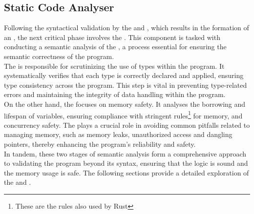 \subsection{Static Code Analyser}

Following the syntactical validation by the \lexer{} and \parser{}, which results in
the formation of an \ast{}, the next critical phase involves the \static{}. This
component is tasked with conducting a semantic analysis of the \ast{}, a process
essential for ensuring the semantic correctness of the program. \\

The \typeChecker{} is responsible for scrutinizing the use of types within the
program. It systematically verifies that each type is correctly declared and applied,
ensuring type consistency across the program. This step is vital in preventing
type-related errors and maintaining the integrity of data handling within the
program. \\

On the other hand, the \borrowChecker{} focuses on memory safety. It analyses the
borrowing and lifespan of variables, ensuring compliance with stringent
rules\footnote{These are the rules also used by Rust} for memory, and concurrency
safety\cite{RUST}. The \borrowChecker{} plays a crucial role in avoiding common pitfalls
related to managing memory, such as memory leaks, unauthorized access and dangling
pointers, thereby enhancing the program's reliability and safety. \\

In tandem, these two stages of semantic analysis form a comprehensive approach to
validating the program beyond its syntax, ensuring that the logic is sound and the
memory usage is safe. The following sections provide a detailed exploration of the
\typeChecker{} and \borrowChecker.



